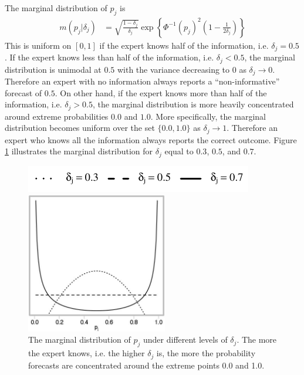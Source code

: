 \documentclass[11pt]{article}
\theoremstyle{definition}
\theoremstyle{definition}
\begin{document}
The marginal distribution of $p_j$ is
\begin{align*}
m(p_j | \delta_j) &= \sqrt{\frac{1-\delta_j}{\delta_j}} \exp \left\{ \Phi^{-1}(p_j)^2 \left(1-\frac{1}{2 \delta_j} \right) \right\} 
\end{align*}
This is uniform on $[0,1]$ if the expert knows half of the information, i.e. $\delta_j = 0.5$. If the expert knows less than half of the information, i.e. $\delta_j < 0.5$, the marginal distribution is unimodal at $0.5$ with the variance decreasing to 0 as $\delta_j \to 0$. Therefore an expert with no information always reports a ``non-informative'' forecast of $0.5$. On other hand, if the expert knows more than half of the information, i.e. $\delta_j > 0.5$, the marginal  distribution is more heavily concentrated around extreme probabilities $0.0$ and $1.0$. More specifically, the marginal distribution becomes uniform over the set $\{0.0,1.0\}$ as $\delta_j \to 1$. Therefore an expert who knows all the information always reports the correct outcome. Figure \ref{marginals} illustrates the marginal distribution for $\delta_j$ equal to $0.3$, $0.5$, and $0.7$. 

\begin{figure}[t]
\centering
	\hspace{0em}\includegraphics{LegendMarginal}

 \includegraphics[width= 0.55\textwidth]{Marginals}
   \caption{The marginal distribution of $p_j$ under different levels of $\delta_j$. The more the expert knows, i.e. the higher $\delta_j$ is, the more the probability forecasts are concentrated around the extreme points 0.0 and 1.0.}
\label{marginals}
\end{figure}
\end{document}
